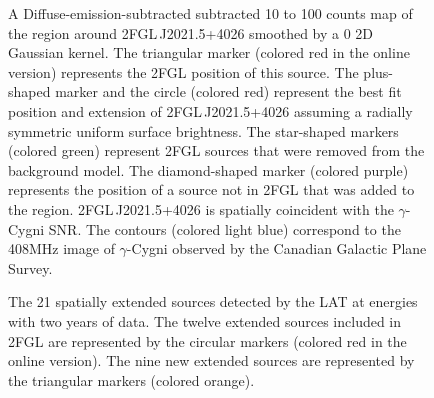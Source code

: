 \documentclass[12pt,preprint]{aastex}
\newif\ifcolorfigure
\newcommand{\gev}{\text{GeV}\xspace}
\begin{document}
\begin{figure}
    \ifcolorfigure
      \plotone{source_plots/source_Gamma_Cygni_color.eps}
    \else
    \fi
  \caption{A Diffuse-emission-subtracted 
  subtracted 10 \gev to 100 \gev counts map of the
  region around 2FGL\,J2021.5+4026 smoothed by a 0 2D Gaussian
  kernel. The triangular marker (colored red in the online version)
  represents the 2FGL position of this source.  The plus-shaped
  marker and the circle (colored red) represent the best fit position
  and extension of 2FGL\,J2021.5+4026 assuming a radially symmetric
  uniform surface brightness.  The star-shaped markers (colored green)
  represent 2FGL sources that were removed from the background model.
  The diamond-shaped marker (colored purple) represents the position of
  a
  source not in 2FGL that was added to the region. 2FGL\,J2021.5+4026
  is spatially coincident with the $\gamma$-Cygni SNR.  The contours
  (colored light blue) correspond to the 408MHz image of $\gamma$-Cygni
  observed by the Canadian Galactic Plane Survey.
  }\label{1FGL_J2020.0+4049}
\end{figure}


\clearpage
  \begin{figure}
      \ifcolorfigure
      \plotone{summary_plots/allsky_extended_sources_color.eps}
      \else
      \fi
      \caption{The 21
      spatially extended sources detected by the LAT
      at \gev energies 
      with two years of data.  The twelve extended sources included in
      2FGL are represented by the circular markers (colored red in the online
      version).  The nine new extended sources are represented by
      the triangular markers (colored orange).}
\label{allsky_extended_sources}
  \end{figure}
\end{document}
